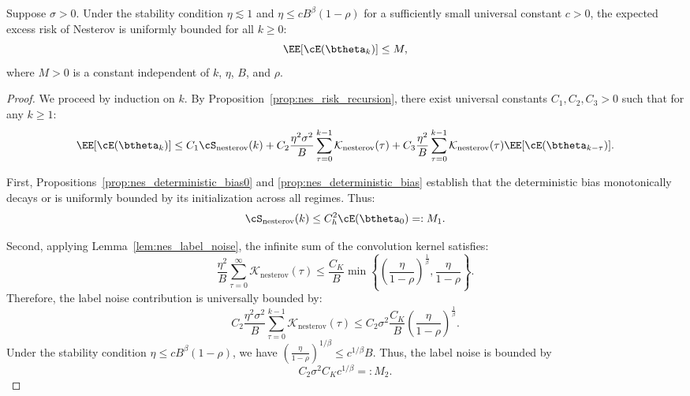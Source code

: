 \documentclass[11pt]{article}
\newcommand{\nesterov}{\mathrm{nesterov}}
\begin{document}
\begin{lemma}
\label{lem:nes_loss_bounded}
Suppose $\sigma > 0$. Under the stability condition $\eta \lesssim 1$ and $\eta \le c B^\beta (1-\rho)$ for a sufficiently small universal constant $c > 0$, the expected excess risk of Nesterov is uniformly bounded for all $k \ge 0$:
\[
    \EE[\cE(\btheta_k)] \le M,
\]
where $M > 0$ is a constant independent of $k$, $\eta$, $B$, and $\rho$.
\end{lemma}

\begin{proof}
We proceed by induction on $k$. By Proposition~\ref{prop:nes_risk_recursion}, there exist universal constants $C_1, C_2, C_3 > 0$ such that for any $k \ge 1$:
\begin{equation} \label{eq:nes_risk_recursion_bound}
    \EE[\cE(\btheta_k)] \le C_1 \cS_{\nesterov}(k) + C_2 \frac{\eta^2\sigma^2}{B}\sum_{\tau=0}^{k-1}\mathcal{K}_{\nesterov}(\tau) + C_3 \frac{\eta^2}{B}\sum_{\tau=0}^{k-1}\mathcal{K}_{\nesterov}(\tau)\EE[\cE(\btheta_{k-\tau})].
\end{equation}

First, Propositions~\ref{prop:nes_deterministic_bias0} and \ref{prop:nes_deterministic_bias} establish that the deterministic bias monotonically decays or is uniformly bounded by its initialization across all regimes. Thus:
\[
    \cS_{\nesterov}(k) \le C_h^2 \cE(\btheta_0) =: M_1.
\]

Second, applying Lemma~\ref{lem:nes_label_noise}, the infinite sum of the convolution kernel satisfies:
\[
    \frac{\eta^2}{B} \sum_{\tau=0}^\infty \mathcal{K}_{\nesterov}(\tau) \le \frac{C_K}{B} \min\left\{ \left(\frac{\eta}{1-\rho}\right)^{\frac1\beta}, \frac{\eta}{1-\rho} \right\}.
\]
Therefore, the label noise contribution is universally bounded by:
\[
    C_2 \frac{\eta^2\sigma^2}{B}\sum_{\tau=0}^{k-1}\mathcal{K}_{\nesterov}(\tau) \le C_2 \sigma^2 \frac{C_K}{B} \left(\frac{\eta}{1-\rho}\right)^{\frac1\beta}.
\]
Under the stability condition $\eta \le c B^\beta (1-\rho)$, we have $\left(\frac{\eta}{1-\rho}\right)^{1/\beta} \le c^{1/\beta} B$. Thus, the label noise is  bounded by
\[
    C_2 \sigma^2 C_K c^{1/\beta} =: M_2.
\]


\end{proof}
\end{document}
